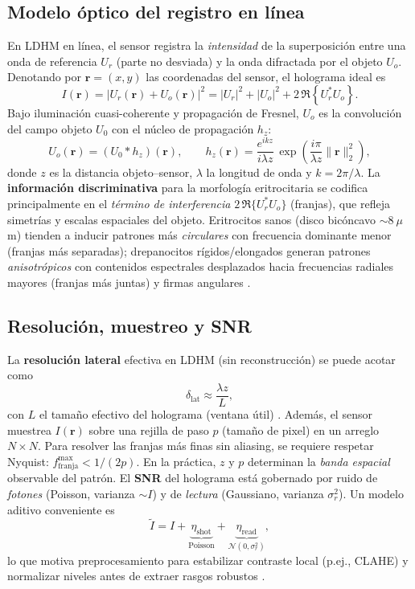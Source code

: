 \subsection{Modelo óptico del registro en línea}
En LDHM en línea, el sensor registra la \emph{intensidad} de la superposición entre una onda de referencia $U_r$ (parte no desviada) y la onda difractada por el objeto $U_o$. Denotando por $\mathbf{r}=(x,y)$ las coordenadas del sensor, el holograma ideal es
\begin{equation}
I(\mathbf{r}) = \big|U_r(\mathbf{r}) + U_o(\mathbf{r})\big|^2 
= |U_r|^2 + |U_o|^2 + 2\,\Re\!\left\{U_r^\ast U_o\right\}.
\label{eq:intensity}
\end{equation}
Bajo iluminación cuasi-coherente y propagación de Fresnel, $U_o$ es la convolución del campo objeto $U_0$ con el núcleo de propagación $h_z$:
\begin{equation}
U_o(\mathbf{r}) = (U_0 \ast h_z)(\mathbf{r}),\qquad 
h_z(\mathbf{r})=\frac{e^{ikz}}{i\lambda z}\,\exp\!\left(\frac{i\pi}{\lambda z}\|\mathbf{r}\|_2^2\right),
\end{equation}
donde $z$ es la distancia objeto–sensor, $\lambda$ la longitud de onda y $k=2\pi/\lambda$. La \textbf{información discriminativa} para la morfología eritrocitaria se codifica principalmente en el \emph{término de interferencia} $2\,\Re\{U_r^\ast U_o\}$ (franjas), que refleja simetrías y escalas espaciales del objeto. Eritrocitos sanos (disco bicóncavo $\sim 8~\mu$m) tienden a inducir patrones más \emph{circulares} con frecuencia dominante menor (franjas más separadas); drepanocitos rígidos/elongados generan patrones \emph{anisotrópicos} con contenidos espectrales desplazados hacia frecuencias radiales mayores (franjas más juntas) y firmas angulares \cite{Greenbaum2014STM,Chen2022Photonics}.

\subsection{Resolución, muestreo y SNR}
La \textbf{resolución lateral} efectiva en LDHM (sin reconstrucción) se puede acotar como
\begin{equation}
\delta_\text{lat} \approx \frac{\lambda z}{L}, 
\end{equation}
con $L$ el tamaño efectivo del holograma (ventana útil) \cite{Chen2022Photonics}. Además, el sensor muestrea $I(\mathbf{r})$ sobre una rejilla de paso $p$ (tamaño de pixel) en un arreglo $N\times N$. Para resolver las franjas más finas sin aliasing, se requiere respetar Nyquist: $f_\text{franja}^\text{max}<1/(2p)$. En la práctica, $z$ y $p$ determinan la \emph{banda espacial} observable del patrón. El \textbf{SNR} del holograma está gobernado por ruido de \emph{fotones} (Poisson, varianza $\sim I$) y de \emph{lectura} (Gaussiano, varianza $\sigma_r^2$). Un modelo aditivo conveniente es
\begin{equation}
\tilde{I} = I + \underbrace{\eta_\text{shot}}_{\text{Poisson}} + \underbrace{\eta_\text{read}}_{\mathcal{N}(0,\sigma_r^2)},
\end{equation}
lo que motiva preprocesamiento para estabilizar contraste local (p.ej., CLAHE) y normalizar niveles antes de extraer rasgos robustos \cite{Zhou2019MedImageContrast}.

